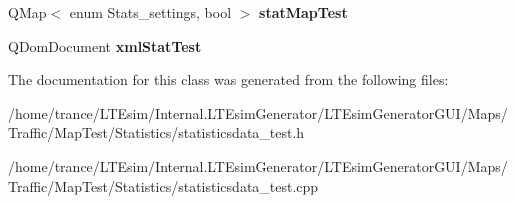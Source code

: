\begin{DoxyCompactItemize}
\item 
Q\+Map$<$ enum Stats\+\_\+settings, bool $>$ {\bfseries stat\+Map\+Test}\hypertarget{class_statistics_data___test_aef89438266092fe3de2cf8f44becd3d6}{}\label{class_statistics_data___test_aef89438266092fe3de2cf8f44becd3d6}

\item 
Q\+Dom\+Document {\bfseries xml\+Stat\+Test}\hypertarget{class_statistics_data___test_aa7270aa0b0e2051c7a4e23bfe2941e2d}{}\label{class_statistics_data___test_aa7270aa0b0e2051c7a4e23bfe2941e2d}

\end{DoxyCompactItemize}


The documentation for this class was generated from the following files\+:\begin{DoxyCompactItemize}
\item 
/home/trance/\+L\+T\+Esim/\+Internal.\+L\+T\+Esim\+Generator/\+L\+T\+Esim\+Generator\+G\+U\+I/\+Maps/\+Traffic/\+Map\+Test/\+Statistics/statisticsdata\+\_\+test.\+h\item 
/home/trance/\+L\+T\+Esim/\+Internal.\+L\+T\+Esim\+Generator/\+L\+T\+Esim\+Generator\+G\+U\+I/\+Maps/\+Traffic/\+Map\+Test/\+Statistics/statisticsdata\+\_\+test.\+cpp\end{DoxyCompactItemize}
